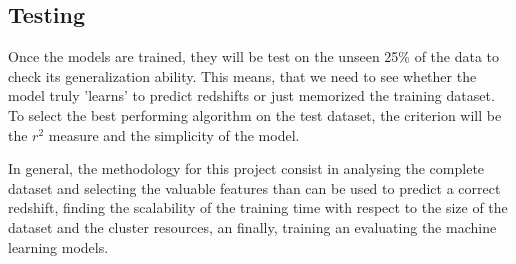 \subsection{Testing}
Once the models are trained, they will be test on the unseen 25\% of the data to check its generalization ability. This means, that we need to see whether the model truly 'learns' to predict redshifts or just memorized the training dataset. To select the best performing algorithm on the test dataset, the criterion will be the $r^2$ measure and the simplicity of the model.



In general, the methodology for this project consist in analysing the complete dataset and selecting the valuable features than can be used to predict a correct redshift, finding the scalability of the training time with respect to the size of the dataset and the cluster resources, an finally, training an evaluating the machine learning models. 




